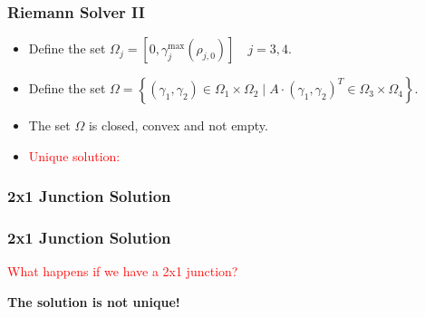 \begin{frame}[fragile]
	\frametitle{Riemann Solver II}
	\begin{itemize}
	\item<1-> Define the set $\Omega_j=[0,\gamma_j^{\max}(\rho_{j,0})] \quad j=3,4.$
	\only<1-1> { \begin{figure}[ht]
\centering

\label{fig:omegaj}
\end{figure}}
	\item<2-> Define the set $\Omega=\left\lbrace(\gamma_1,\gamma_2)\in \Omega_1\times \Omega_2 \mid A\cdot (\gamma_1 , \gamma_2)^{T}\in \Omega_3\times\Omega_4\right\rbrace .$
	\only<2-3> { \begin{figure}[ht]
\centering

\label{fig:omega}
\end{figure}}
\item<3-> The set $\Omega$ is closed, convex and not empty.
\item<4->\textcolor{red}{Unique solution:}
\begin{figure}[ht]
\centering

\label{fig:solution}
\end{figure}
\end{itemize}
\end{frame}

\subsubsection{2x1 Junction Solution}
\begin{frame}[fragile]
	\frametitle{2x1 Junction Solution}
	\begin{center}
\textcolor{red}{What happens if we have a 2x1 junction?}
	\end{center}
\pause	
	\begin{figure}[ht]
\centering

\label{fig:2x1junction}
\end{figure}
\pause
\begin{center}
\textbf{The solution is not unique!}
\end{center}
\end{frame}

